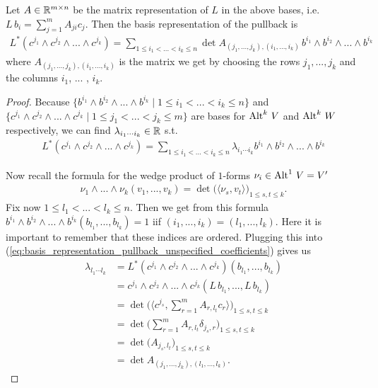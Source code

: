 \documentclass[../master_thesis.tex]{subfiles}
\begin{document}
\begin{proposition}
    Let $A \in \mathbb{R}^{m\times n}$ be the matrix representation of $L$ in the 
    above bases, i.e.
    $L\,b_i = \sum_{j=1}^m A_{ji} c_j$. Then the basis representation 
    of the pullback is
    \begin{align}
        L^* (c^{j_1} \wedge c^{j_2} \wedge ... \wedge c^{j_k})
        = \sum\limits_{1 \leq i_1 < ... < i_k \leq n} 
            \det A_{(j_1,...,j_k),(i_1,...,i_k)} \,
            b^{i_1} \wedge b^{i_2} \wedge ... \wedge b^{i_k}
        \label{eq:basis_representation_pullback}
    \end{align}
    where $A_{(j_1,...,j_k),(i_1,...,i_k)}$ is the matrix we get 
    by choosing the rows $j_1,...,j_k$  and the columns $i_1$, ... , $i_k$. 
\end{proposition}
\begin{proof}
    Because $\{ b^{i_1}\wedge b^{i_2}\wedge ... \wedge b^{i_k} 
    \mid 1 \leq i_1 < ... < i_k  \leq n \}$ and 
    $\{ c^{j_1}\wedge c^{j_2}\wedge ... \wedge c^{j_k} 
    \mid 1 \leq j_1 < ... < j_k  \leq m \}$ are bases for ${\operatorname{Alt}^{k}\,V}$ 
    and ${\operatorname{Alt}^{k}\,W}$ respectively, we can find $\lambda_{i_1 \cdots i_k} \in \mathbb{R}$ s.t.
    \begin{align}
        L^* (c^{j_1} \wedge c^{j_2} \wedge ... \wedge c^{j_k})
        = \sum\limits_{1 \leq i_1 < ... < i_k \leq n} 
        \lambda_{i_1 \cdots i_k} b^{i_1} \wedge b^{i_2} \wedge ... \wedge b^{i_k}
        \label{eq:basis_representation_pullback_unspecified_coefficients}
    \end{align}

    Now recall the formula for the wedge product of $1$-forms 
    $\nu_i \in {\operatorname{Alt}^{1}\,V} = V'$
    \begin{align*}
        \nu_1 \wedge ... \wedge \nu_k (v_1,...,v_k) = 
        \det \big( \langle \nu_s, v_t \rangle \big)_{1 \leq s,t \leq k}.
    \end{align*}
    Fix now $1 \leq l_1 < ... <  l_k \leq n$. Then we get from this formula
    $b^{i_1} \wedge b^{i_2} \wedge ... \wedge b^{i_k} ( b_{l_1},...,b_{l_k}) = 1$ 
    iif $(i_1,...,i_k) = (l_1,...,l_k)$. Here it is important to remember that 
    these indices are ordered. Plugging this into 
    (\ref{eq:basis_representation_pullback_unspecified_coefficients}) gives us 
    \begin{align*}
        \lambda_{l_1 \cdots l_k}  &= 
            L^* (c^{j_1} \wedge c^{j_2} \wedge ... \wedge c^{j_k})
            (b_{l_1},...,b_{l_k})
        \\ &= c^{j_1} \wedge c^{j_2} \wedge ... \wedge c^{j_k} 
            (L\,b_{l_1},...,L\,b_{l_k})
        \\ &= \det \Big( \big \langle c^{j_s}, \sum_{r = 1}^m A_{r,l_t}c_{r} \big \rangle 
            \Big)_{1 \leq s,t \leq k}
        \\ &= \det \Big( \sum_{r = 1}^m A_{r,l_t} \delta_{j_s,r}
            \Big)_{1 \leq s,t \leq k}
        \\ &= \det \big( A_{j_s,l_t} \big)_{1 \leq s,t \leq k}
        \\ &= \det A_{(j_1,...,j_k),(l_1,...,l_k)}.
    \end{align*}
\end{proof}
\end{document}
